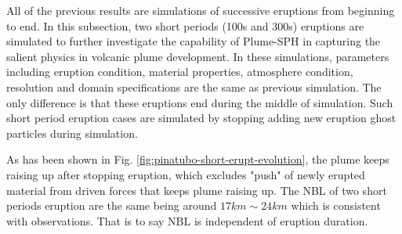 All of the previous results are simulations of successive eruptions from beginning to end. In this subsection, two short periods (100s and 300s) eruptions are simulated to further investigate the capability of Plume-SPH in capturing the salient physics in volcanic plume development. In these simulations, parameters including eruption condition, material properties, atmosphere condition, resolution and domain specifications are the same as previous simulation. The only difference is that these eruptions end during the middle of simulation. Such short period eruption cases are simulated by stopping adding new eruption ghost particles during simulation.

As has been shown in Fig. \ref{fig:pinatubo-short-erupt-evolution}, the plume keeps raising up after stopping eruption, which excludes "push" of newly erupted material from driven forces that keeps plume raising up. The NBL of two short periods eruption are the same being around $17 km \sim 24 km$ which is consistent with observations. That is to say NBL is independent of eruption duration.

